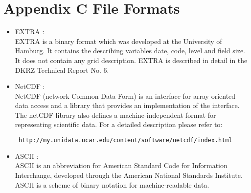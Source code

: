 \clearpage

\section{Appendix C \hspace{0.5cm} File Formats}
\label{ch:appendix:formats}

\begin{itemize}
\item EXTRA :\\
EXTRA is a binary format which was developed at the University of Hamburg. 
It contains the describing variables date, code, level and field size. It does not 
contain any grid description. EXTRA is described in detail in the DKRZ Technical Report No. 6.

\item NetCDF :\\
NetCDF (network Common Data Form) is an interface for array-oriented data access and a 
library that provides an implementation of the interface. 
The netCDF library also defines a machine-independent format for representing scientific data. 
For a detailed description please refer to: 
\begin{verbatim} http://my.unidata.ucar.edu/content/software/netcdf/index.html \end{verbatim} 
\item ASCII :\\
ASCII is an abbreviation for American Standard Code for Information Interchange, 
developed through the American National Standards Institute. 
ASCII is a scheme of binary notation for machine-readable data.
\end{itemize}


